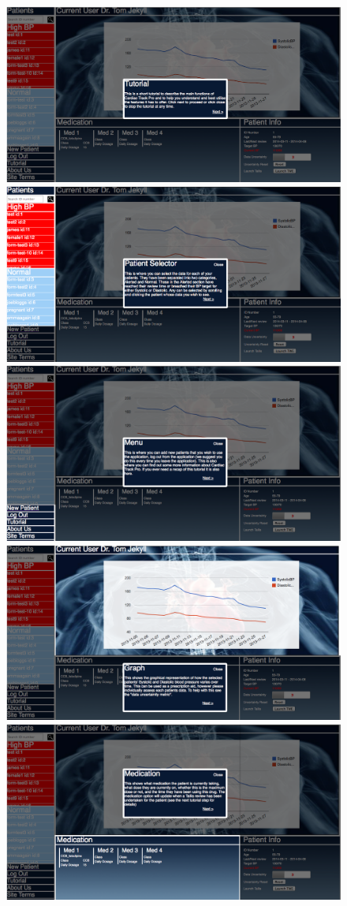 \documentclass[11pt]{article}
\begin{document}
\begin{figure}[h!] 
\centering
\includegraphics[width=0.8\linewidth]{tutorial1.png}
\includegraphics[width=0.8\linewidth]{tutorial2.png}
\includegraphics[width=0.8\linewidth]{tutorial3.png}
\endminipage\hfill
{}
\centering 
\includegraphics[width=0.8\linewidth]{tutorial4.png}
\includegraphics[width=0.8\linewidth]{tutorial5.png}

\end{figure}
\end{document}
